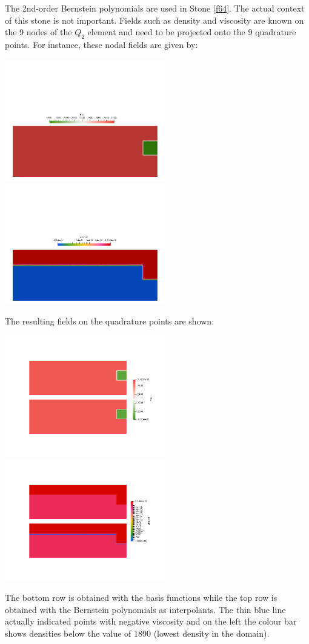 The 2nd-order Bernstein polynomials are used in Stone \ref{f64}. The actual context of this stone is not 
important. Fields such as density and viscosity are known on the 
9 nodes of the $Q_2$ element and need to be projected onto the 9 quadrature points. 
For instance, these nodal fields are given by:
\begin{center}
\includegraphics[width=7cm]{images/bernstein/rhonodal.png}
\includegraphics[width=7cm]{images/bernstein/etaeffnodal.png}
\end{center}
The resulting fields on the quadrature points are shown:
\begin{center}
\includegraphics[width=7cm]{images/bernstein/qrho.png}
\includegraphics[width=7cm]{images/bernstein/qetaeff.png}
\end{center}
The bottom row is obtained with the basis functions while the top row is obtained with the Bernstein 
polynomials as interpolants. The thin blue line actually indicated points with negative viscosity and 
on the left the colour bar shows densities below the value of 1890 (lowest density in the domain).


 







 

